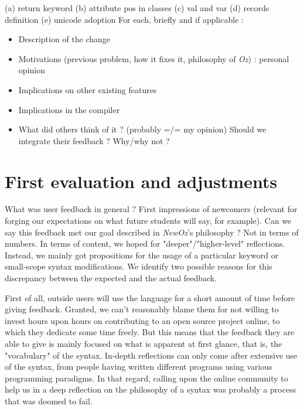 (a) return keyword (b) attribute pos in classes (c) val and var (d) records definition (e) unicode adoption\newline
For each, briefly and if applicable :
\begin{itemize}
    \item Description of the change
    \item Motivations (previous problem, how it fixes it, philosophy of \textit{Oz}) : personal opinion
    \item Implications on other existing features
    \item Implications in the compiler
    \item What did others think of it ? (probably =/= my opinion) Should we integrate their feedback ? Why/why not ?
\end{itemize}

\section{First evaluation and adjustments}\label{sec:ch4-adjustments}
What was user feedback in general ?
First impressions of newcomers (relevant for forging our expectations on what future students will say, for example).\newline
Can we say this feedback met our goal described in \textit{NewOz}'s philosophy ?
Not in terms of numbers.
In terms of content, we hoped for "deeper"/"higher-level" reflections.
Instead, we mainly got propositions for the usage of a particular keyword or small-scope syntax modifications.\newline
We identify two possible reasons for this discrepancy between the expected and the actual feedback.\newline

First of all, outside users will use the language for a short amount of time before giving feedback.
Granted, we can't reasonably blame them for not willing to invest hours upon hours on contributing to an open source project online, to which they dedicate some time freely.
But this means that the feedback they are able to give is mainly focused on what is apparent at first glance, that is, the "vocabulary" of the syntax.
In-depth reflections can only come after extensive use of the syntax, from people having written different programs using various programming paradigms.
In that regard, calling upon the online community to help us in a deep reflection on the philosophy of a syntax was probably a process that was doomed to fail.\newline

